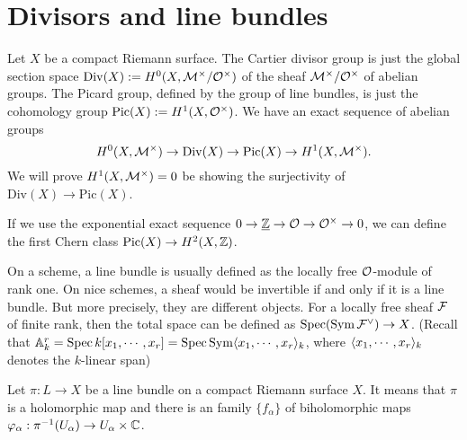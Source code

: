 \documentclass{../../large}
\begin{document}
\section{Divisors and line bundles}


Let $X$ be a compact Riemann surface.
The Cartier divisor group is just the global section space $\mathrm{Div}(X):=H^0(X,\mathcal{M}^\times/\mathcal{O}^\times)$ of the sheaf $\mathcal{M}^\times/\mathcal{O}^\times$ of abelian groups.
The Picard group, defined by the group of line bundles, is just the cohomology group $\mathrm{Pic}(X):=H^1(X,\mathcal{O}^\times)$.
We have an exact sequence of abelian groups
\[H^0(X,\mathcal{M}^\times)\to\mathrm{Div}(X)\to\mathrm{Pic}(X)\to H^1(X,\mathcal{M}^\times).\]
We will prove $H^1(X,\mathcal{M}^\times)=0$ be showing the surjectivity of $\mathrm{Div}(X)\to\mathrm{Pic}(X)$.

If we use the exponential exact sequence $0\to\underline{\mathbb{Z}}\to\mathcal{O}\to\mathcal{O}^\times\to0$, we can define the first Chern class $\mathrm{Pic}(X)\to H^2(X,\mathbb{Z})$.




On a scheme, a line bundle is usually defined as the locally free $\mathcal{O}$-module of rank one.
On nice schemes, a sheaf would be invertible if and only if it is a line bundle.
But more precisely, they are different objects.
For a locally free sheaf $\mathcal{F}$ of finite rank, then the total space can be defined as $\operatorname{Spec}(\operatorname{Sym}\mathcal{F}^\vee)\to X$.
(Recall that $\mathbb{A}_k^r=\operatorname{Spec} k[x_1,\cdots,x_r]=\operatorname{Spec}\operatorname{Sym}\langle x_1,\cdots,x_r\rangle_k$, where $\langle x_1,\cdots,x_r\rangle_k$ denotes the $k$-linear span)

Let $\pi:L\to X$ be a line bundle on a compact Riemann surface $X$.
It means that $\pi$ is a holomorphic map and there is an family $\{f_\alpha\}$ of biholomorphic maps $\varphi_\alpha:\pi^{-1}(U_\alpha)\to U_\alpha\times\mathbb{C}$.
\end{document}
